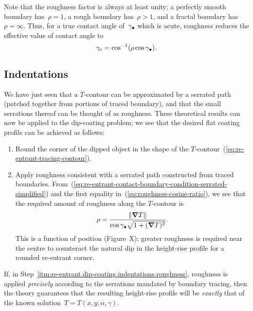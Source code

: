 Note that the roughness factor is always at least unity;
a perfectly smooth boundary has~$\rho = 1$,
a rough boundary has~$\rho > 1$,
and a fractal boundary has~$\rho = \infty$.
Thus, for a true contact angle of~$\gamma_\bullet$ which is acute,
roughness reduces the effective value of contact angle to
\begin{equation}
  \gamma_\eff = \cos^{-1} \roundbr*{\rho \cos\tr{\gamma}}.
  \label{eq:effective-contact-angle}
\end{equation}

\subsection{Indentations}
\label{sec:re-entrant.dip-coating.indentations}

We have just seen that a $T$-contour can be approximated by a serrated path
(patched together from portions of traced boundary),
and that the small serrations thereof can be thought of as roughness.
These theoretical results can now be applied to the dip-coating problem;
we see that the desired flat coating profile can be achieved
as follows:
\begin{enumerate}
  \item
    Round the corner of the dipped object
    in the shape of the $T$-contour~(\ref{eq:re-entrant-tracing-contour}).
  \item
  \label{itm:re-entrant.dip-coating.indentations.roughness}
    Apply roughness consistent with a serrated path
    constructed from traced boundaries.
    From~(\ref{eq:re-entrant-contact-boundary-condition-serrated-simplified})
    and the first equality in~(\ref{eq:roughness-cosine-ratio}),
    we see that the required amount of roughness along the $T$-contour is
    \begin{equation}
      \rho = \frac{\lVert\mathop{}\!\boldsymbol{\mathbf{\nabla}} T\rVert}{\cos\gamma_\bullet \sqrt{1 + (\mathop{}\!\boldsymbol{\mathbf{\nabla}} T)^2}}.
      \label{eq:roughness-required}
    \end{equation}
    This is a function of position
    (Figure~X); %
    greater roughness is required near the centre
    to counteract the natural dip in the height-rise profile
    for a rounded re-entrant corner.
\end{enumerate}
If, in Step~\ref{itm:re-entrant.dip-coating.indentations.roughness},
roughness is applied \emph{precisely} according to the serrations
mandated by boundary tracing,
then the theory guarantees that
the resulting height-rise profile will be \emph{exactly}
that of the known solution~$T = T (x, y; \alpha, \gamma)$.

